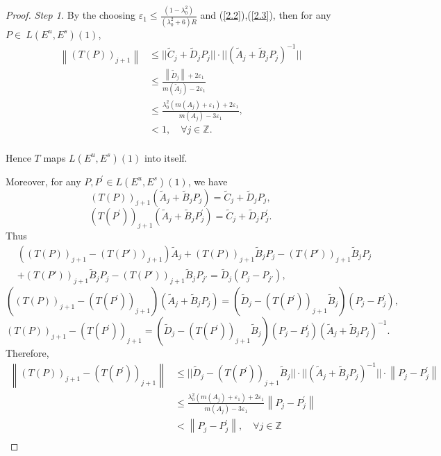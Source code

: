 \documentclass[12pt]{article}
\begin{document}
\begin{proof}{\em Step 1.}
	By the choosing $ \varepsilon_1\leqslant \frac{(1-\lambda_{0}^{2})}{(\lambda_{0}^{2}+6)R} $ and (\ref{2.2}),(\ref{2.3}), then for any  $ P\in\ L(E^{u},E^{s})(1) $,
	\begin{equation}
		\begin{aligned}
			\left\|(T(P))_{j+1}\right\|&
			\leqslant||\widetilde{C}_{j}+\widetilde{D}_{j}P_{j}||\cdot||(\widetilde{A}_{j}+\widetilde{B}_{j}P_{j})^{-1}|| \\
			&\leqslant\frac{\left\|\widetilde{D}_{j}\right\|+2\varepsilon_1}{m(\widetilde{A}_{j})-2\varepsilon_1} \\
			&\leqslant\frac{\lambda_{0}^{2}(m(A_{j})+\varepsilon_1)+2\varepsilon_{1}}{m(A_{j})-3\varepsilon_1}, \\ 
			&<1, \quad \forall j\in \mathbb Z.\\ 
		\end{aligned}
		\nonumber
	\end{equation}
	
	Hence $ T $ maps $  L(E^{u},E^{s})(1) $ into itself.
	
	Moreover, for any  $ P,P^{'}\in L(E^{u},E^{s})(1) $, we have
	$$
	(T(P))_{j+1}(\widetilde{A}_{j}+\widetilde{B}_{j}P_{j})=\widetilde{C}_{j}+\widetilde{D}_{j}P_{j},
	$$
	$$
	(T(P^{'}))_{j+1}(\widetilde{A}_{j}+\widetilde{B}_{j}P_{j}^{'})=\widetilde{C}_{j}+\widetilde{D}_{j}P_{j}^{'}.
	$$
	Thus
	\begin{align*}
		&((T(P))_{j+1}-(T(P'))_{j+1})\widetilde{A}_{j}
		+(T(P))_{j+1}\widetilde{B}_{j}P_{j}
		-(T(P'))_{j+1}\widetilde{B}_{j}P_{j} \\
		&+(T(P'))_{j+1}\widetilde{B}_{j}P_{j}
		-(T(P'))_{j+1}\widetilde{B}_{j}P_{j'}
		= \widetilde{D}_{j}(P_{j}-P_{j'}),
	\end{align*}
	$$
	((T(P))_{j+1}-(T(P^{'}))_{j+1})(\widetilde{A}_{j}+\widetilde{B}_{j}P_{j})=(\widetilde{D}_{j}-(T(P^{'}))_{j+1}\widetilde{B}_{j})(P_{j}-P_{j}^{'}),
	$$
	$$
	(T(P))_{j+1}-(T(P^{'}))_{j+1}=(\widetilde{D}_{j}-(T(P^{'}))_{j+1}\widetilde{B}_{j})(P_{j}-P_{j}^{'})(\widetilde{A}_{j}+\widetilde{B}_{j}P_{j})^{-1}.
	$$
	Therefore,
	\begin{equation}
		\begin{aligned}
			\left\|(T(P))_{j+1}-(T(P^{'}))_{j+1}\right\|&
			\leqslant||\widetilde{D}_{j}-(T(P^{'}))_{j+1}\widetilde{B}_{j}||\cdot||(\widetilde{A}_{j}+\widetilde{B}_{j}P_{j})^{-1}||\cdot\left\|P_{j}-P_{j}^{'}\right\|\\
			&\leqslant\frac{\lambda_{0}^{2}(m(A_{j})+\varepsilon_1)+2\varepsilon_1}{m(A_{j})-3\varepsilon_1}\left\|P_{j}-P_{j}^{'}\right\| \\
			&<\left\|P_{j}-P_{j}^{'}\right\|, \quad\forall j\in \mathbb Z\\
		\end{aligned}
		\nonumber
	\end{equation}
	

\end{proof}
\end{document}
